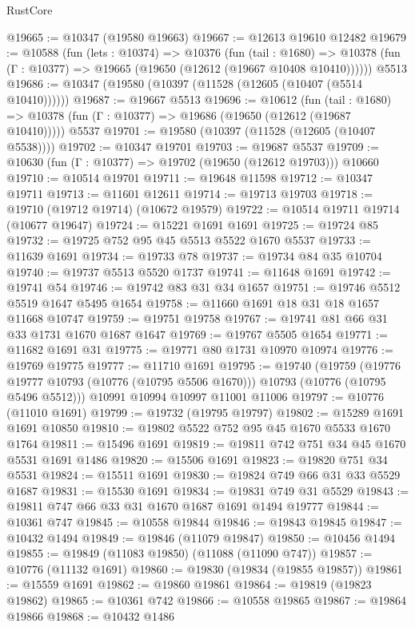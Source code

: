 \begin{lexlean}{RustCore}
\begin{coremodule}
@19665 := @10347 (@19580 @19663)
@19667 := @12613 @19610 @12482
@19679 := @10588
    (fun (lets : @10374) =>
    @10376
      (fun (tail : @1680) =>
      @10378 (fun (Γ : @10377) => @19665 (@19650 (@12612 (@19667 @10408 @10410))))))
    @5513
@19686 := @10347 (@19580 (@10397 (@11528 (@12605 (@10407 (@5514 @10410))))))
@19687 := @19667 @5513
@19696 := @10612
    (fun (tail : @1680) => @10378 (fun (Γ : @10377) => @19686 (@19650 (@12612 (@19687 @10410)))))
    @5537
@19701 := @19580 (@10397 (@11528 (@12605 (@10407 @5538))))
@19702 := @10347 @19701
@19703 := @19687 @5537
@19709 := @10630 (fun (Γ : @10377) => @19702 (@19650 (@12612 @19703))) @10660
@19710 := @10514 @19701
@19711 := @19648 @11598
@19712 := @10347 @19711
@19713 := @11601 @12611
@19714 := @19713 @19703
@19718 := @19710 (@19712 @19714) (@10672 @19579)
@19722 := @10514 @19711 @19714 (@10677 @19647)
@19724 := @15221 @1691 @1691
@19725 := @19724 @85
@19732 := @19725 @752 @95 @45 @5513 @5522 @1670 @5537
@19733 := @11639 @1691
@19734 := @19733 @78
@19737 := @19734 @84 @35 @10704
@19740 := @19737 @5513 @5520 @1737
@19741 := @11648 @1691
@19742 := @19741 @54
@19746 := @19742 @83 @31 @34 @1657
@19751 := @19746 @5512 @5519 @1647 @5495 @1654
@19758 := @11660 @1691 @18 @31 @18 @1657 @11668 @10747
@19759 := @19751 @19758
@19767 := @19741 @81 @66 @31 @33 @1731 @1670 @1687 @1647
@19769 := @19767 @5505 @1654
@19771 := @11682 @1691 @31
@19775 := @19771 @80 @1731 @10970 @10974
@19776 := @19769 @19775
@19777 := @11710 @1691
@19795 := @19740
    (@19759
      (@19776 @19777 @10793 (@10776 (@10795 @5506 @1670)))
      @10793
      (@10776 (@10795 @5496 @5512)))
    @10991
    @10994
    @10997
    @11001
    @11006
@19797 := @10776 (@11010 @1691)
@19799 := @19732 (@19795 @19797)
@19802 := @15289 @1691 @1691 @10850
@19810 := @19802 @5522 @752 @95 @45 @1670 @5533 @1670 @1764
@19811 := @15496 @1691
@19819 := @19811 @742 @751 @34 @45 @1670 @5531 @1691 @1486
@19820 := @15506 @1691
@19823 := @19820 @751 @34 @5531
@19824 := @15511 @1691
@19830 := @19824 @749 @66 @31 @33 @5529 @1687
@19831 := @15530 @1691
@19834 := @19831 @749 @31 @5529
@19843 := @19811 @747 @66 @33 @31 @1670 @1687 @1691 @1494 @19777
@19844 := @10361 @747
@19845 := @10558 @19844
@19846 := @19843 @19845
@19847 := @10432 @1494
@19849 := @19846 (@11079 @19847)
@19850 := @10456 @1494
@19855 := @19849 (@11083 @19850) (@11088 (@11090 @747))
@19857 := @10776 (@11132 @1691)
@19860 := @19830 (@19834 (@19855 @19857))
@19861 := @15559 @1691
@19862 := @19860 @19861
@19864 := @19819 (@19823 @19862)
@19865 := @10361 @742
@19866 := @10558 @19865
@19867 := @19864 @19866
@19868 := @10432 @1486

\end{coremodule}
\end{lexlean}
